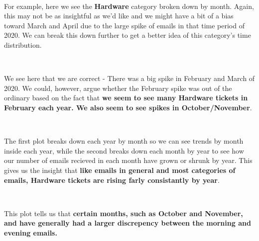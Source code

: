 \documentclass[11pt]{article}
\begin{document}
    \begin{center}
    \end{center}
    { \hspace*{\fill} \\}
    
    For example, here we see the \textbf{Hardware} category broken down by
month. Again, this may not be as insightful as we'd like and we might
have a bit of a bias toward March and April due to the large spike of
emails in that time period of 2020. We can break this down further to
get a better idea of this category's time distribution.


    \begin{center}
    \end{center}
    { \hspace*{\fill} \\}
    
    We see here that we are correct - There was a big spike in February and
March of 2020. We could, however, argue whether the February spike was
out of the ordinary based on the fact that \textbf{we seem to see many
Hardware tickets in February each year. We also seem to see spikes in
October/November}.


    \begin{center}
    \end{center}
    { \hspace*{\fill} \\}
    
    The first plot breaks down each year by month so we can see trends by
month inside each year, while the second breaks down each month by year
to see how our number of emails recieved in each month have grown or
shrunk by year. This gives us the insight that \textbf{like emails in
general and most categories of emails, Hardware tickets are rising farly
consistantly by year}.


    \begin{center}
    \end{center}
    { \hspace*{\fill} \\}
    
    This plot tells us that \textbf{certain months, such as October and
November, and have generally had a larger discrepency between the
morning and evening emails.}
\end{document}
